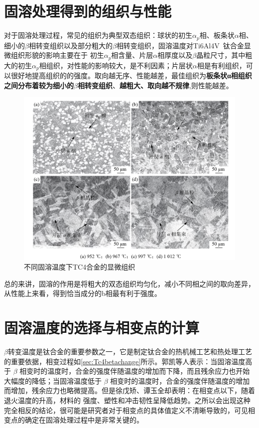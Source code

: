 \documentclass[
class = book,
zihao = -4,
font = noto,
paper = a4paper,
openany
]{easybook}
\begin{document}
\section{固溶处理得到的组织与性能}
对于固溶处理过程，常见的组织为典型双态组织：球状的初生$ \alpha_p $相、板条状$ \alpha $相、细小的$ \beta $相转变组织以及部分粗大的$ \beta $相转变组织\cite{zhanghaoyinGurongShixiaoduiTC4taihejinzuzhihelixuexingnengdeyingxiang2014}，固溶温度对Ti6Al4V 钛合金显微组织形貌的影响主要在于 初生$ \alpha_p $相含量、片层$ \alpha $相厚度以及$\beta$晶粒尺寸，其中粗大的初生$ \alpha_p $相组织，对性能的影响较大，是不利因素；片层状$ \alpha $相是有利组织，可以很好地提高组织的的强度\cite{ranxingGurongwenduduiTi6Al4VELItaihejinxianweizuzhijixingnengdeyingxiang2021}。取向越无序、性能越差，最佳组织为\textbf{板条状α相组织之间分布着较为细小的$\beta$相转变组织}、\textbf{越粗大、取向越不规律},则性能越差。
\begin{figure}[h!]
	\centering
	\includegraphics[width=0.7\linewidth]{金相_丙}
	\caption{不同固溶温度下TC4合金的显微组织}
	\label{fig:}
\end{figure}


总的来讲，固溶的作用是将粗大的双态组织均匀化，减小不同相之间的取向差异，从性能上来看，得到恰当成分的b相最有利于强度。

\section{固溶温度的选择与相变点的计算}
$\beta$转变温度是钛合金的重要参数之一，它是制定钛合金的热机械工艺和热处理工艺的重要依据，相变过程如\ref{sec:Tc4betachange}所示。郭凯\cite{guokaiTC4taihejinrechuligongyideyanjiuxianzhuangjijinzhan2021}等人表示：当固溶温度高于 $\beta$ 相变时的温度时，合金的强度伴随温度的增加而下降，而且残余应力也开始大幅度的降低；当固溶温度低于 $\beta$ 相变时的温度时，合金的强度伴随温度的增加而增加，残余应力也略微提高。但是徐戊矫、谭玉全\cite{xujianGurongshixiaogongyiduiTC4taihejinzuzhijixingnengdeyingxiang2014}却表明：在相变点以下，随着退火温度的升高，材料的 强度、塑性和冲击韧性呈降低趋势。之所以会出现这种完全相反的结论，很可能是研究者对于相变点的具体值定义不清晰导致的，可见相变点的确定在固溶处理过程中是非常关键的。
\end{document}

